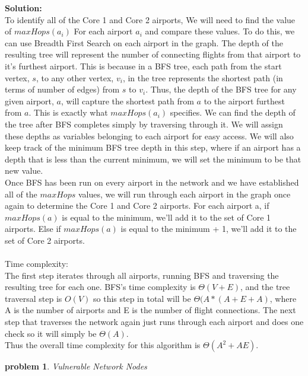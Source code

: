 \documentclass[10pt]{article}
\newcommand{\solution}[1]{\color{blue}\hfill\break\noindent\textbf{Solution:} #1\color{black}}
\newtheorem{problem}{\sc\color{cit}problem}
\begin{document}
\solution{ \\
\null \quad To identify all of the Core 1 and Core 2 airports, We will need to find the value of $maxHops(a_i)$ For each airport $a_i$ and compare these values. To do this, we can use Breadth First Search on each airport in the graph. The depth of the resulting tree will represent the number of connecting flights from that airport to it's furthest airport. This is because in a BFS tree, each path from the start vertex, $s$, to any other vertex, $v_i$, in the tree represents the shortest path (in terms of number of edges) from $s$ to $v_i$. Thus, the depth of the BFS tree for any given airport, $a$, will capture the shortest path from $a$ to the airport furthest from $a$. This is exactly what $maxHops(a_i)$ specifies. We can find the depth of the tree after BFS completes simply by traversing through it. We will assign these depths as variables belonging to each airport for easy access. We will also keep track of the minimum BFS tree depth in this step, where if an airport has a depth that is less than the current minimum, we will set the minimum to be that new value.  \\
\null \quad Once BFS has been run on every airport in the network and we have established all of the $maxHops$ values, we will run through each airport in the graph once again to determine the Core 1 and Core 2 airports. For each airport a, if  $maxHops(a)$ is equal to the minimum, we'll add it to the set of Core 1 airports. Else if $maxHops(a)$ is equal to the minimum + 1, we'll add it to the set of Core 2 airports. \\ \\
Time complexity: \\
\null \quad The first step iterates through all airports, running BFS and traversing the resulting tree for each one. BFS's time complexity is $\Theta(V+E)$, and the tree traversal step is $O(V)$ so this step in total will be $\Theta(A*(A+E+A)$, where A is the number of airports and E is the number of flight connections. The next step that traverses the network again just runs through each airport and does one check so it will simply be $\Theta(A)$. \\ 
\null \quad Thus the overall time complexity for this algorithm is $\Theta(A^2 + AE)$.
}

\pagebreak

\begin{problem}Vulnerable Network Nodes\end{problem}
\end{document}
